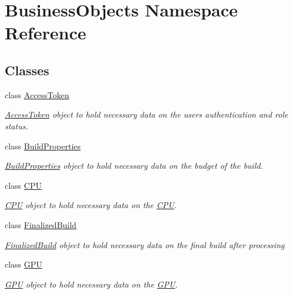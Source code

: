 \hypertarget{namespace_business_objects}{}\section{Business\+Objects Namespace Reference}
\label{namespace_business_objects}
\subsection*{Classes}
\begin{DoxyCompactItemize}
\item 
class \hyperlink{class_business_objects_1_1_access_token}{Access\+Token}
\begin{DoxyCompactList}\small\item\em \hyperlink{class_business_objects_1_1_access_token}{Access\+Token} object to hold necessary data on the user\textquotesingle{}s authentication and role status. \end{DoxyCompactList}\item 
class \hyperlink{class_business_objects_1_1_build_properties}{Build\+Properties}
\begin{DoxyCompactList}\small\item\em \hyperlink{class_business_objects_1_1_build_properties}{Build\+Properties} object to hold necessary data on the budget of the build. \end{DoxyCompactList}\item 
class \hyperlink{class_business_objects_1_1_c_p_u}{C\+PU}
\begin{DoxyCompactList}\small\item\em \hyperlink{class_business_objects_1_1_c_p_u}{C\+PU} object to hold necessary data on the \hyperlink{class_business_objects_1_1_c_p_u}{C\+PU}. \end{DoxyCompactList}\item 
class \hyperlink{class_business_objects_1_1_finalized_build}{Finalized\+Build}
\begin{DoxyCompactList}\small\item\em \hyperlink{class_business_objects_1_1_finalized_build}{Finalized\+Build} object to hold necessary data on the final build after processing \end{DoxyCompactList}\item 
class \hyperlink{class_business_objects_1_1_g_p_u}{G\+PU}
\begin{DoxyCompactList}\small\item\em \hyperlink{class_business_objects_1_1_g_p_u}{G\+PU} object to hold necessary data on the \hyperlink{class_business_objects_1_1_g_p_u}{G\+PU}. \end{DoxyCompactList}\item 

\end{DoxyCompactItemize}
